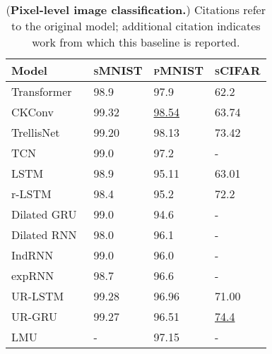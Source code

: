 \begin{table}[t]
  \small
  \centering
  \captionsetup{type=table}
  \caption{
    (\textbf{Pixel-level image classification.})
    Citations refer to the original model; additional citation indicates work from which this baseline is reported.
  }
  \begin{tabular}{@{}llll@{}}
    \toprule
    Model                                                      & \textsc{sMNIST}   & \textsc{pMNIST}   & \textsc{sCIFAR}   \\
    \midrule
    Transformer~\citep{vaswani2017attention,trinh2018learning} & 98.9              & 97.9              & 62.2              \\
    \midrule
    CKConv~\citep{romero2021ckconv}                            & 99.32             & \underline{98.54} & 63.74             \\
    TrellisNet~\citep{trellisnet}                              & 99.20             & 98.13             & 73.42             \\
    TCN~\citep{bai2018empirical}                               & 99.0              & 97.2              & -                 \\
    \midrule
    LSTM~\citep{lstm,gu2020improving}                          & 98.9              & 95.11             & 63.01             \\
    r-LSTM ~\citep{trinh2018learning}                          & 98.4              & 95.2              & 72.2              \\
    Dilated GRU~\citep{chang2017dilated}                       & 99.0              & 94.6              & -                 \\
    Dilated RNN~\citep{chang2017dilated}                       & 98.0              & 96.1              & -                 \\
    IndRNN~\citep{indrnn}                                      & 99.0              & 96.0              & -                 \\
    expRNN~\citep{lezcano2019cheap}                            & 98.7              & 96.6              & -                 \\
    UR-LSTM                                                    & 99.28             & 96.96             & 71.00             \\
    UR-GRU~\citep{gu2020improving}                             & 99.27             & 96.51             & \underline{74.4}  \\
    LMU~\citep{voelker2019legendre}                            & -                 & 97.15             & -                 \\

\end{tabular}
\end{table}

